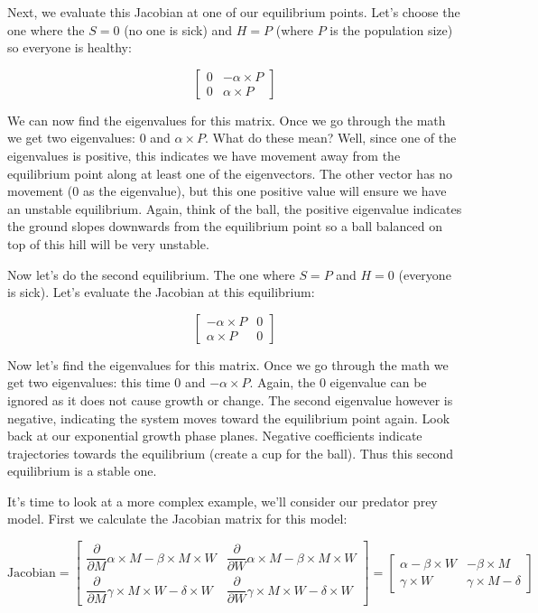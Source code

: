 \documentclass[]{memoir}
\begin{document}
Next, we evaluate this Jacobian at one of our equilibrium points. Let's
choose the one where the $S=0$ (no one is sick) and $H=P$ (where $P$ is
the population size) so everyone is healthy:

\[
\begin{bmatrix}
0 & -\alpha \times P \\
0 & \alpha \times P
\end{bmatrix}
\]

We can now find the eigenvalues for this matrix. Once we go through the
math we get two eigenvalues: 0 and $\alpha \times P$. What do these
mean? Well, since one of the eigenvalues is positive, this indicates we
have movement away from the equilibrium point along at least one of the
eigenvectors. The other vector has no movement (0 as the eigenvalue),
but this one positive value will ensure we have an unstable equilibrium.
Again, think of the ball, the positive eigenvalue indicates the ground
slopes downwards from the equilibrium point so a ball balanced on top of
this hill will be very unstable.

Now let's do the second equilibrium. The one where $S=P$ and $H=0$
(everyone is sick). Let's evaluate the Jacobian at this equilibrium:

\[
\begin{bmatrix}
-\alpha \times P & 0 \\
\alpha \times P & 0
\end{bmatrix}
\]

Now let's find the eigenvalues for this matrix. Once we go through the
math we get two eigenvalues: this time 0 and $-\alpha \times P$. Again,
the 0 eigenvalue can be ignored as it does not cause growth or change.
The second eigenvalue however is negative, indicating the system moves
toward the equilibrium point again. Look back at our exponential growth
phase planes. Negative coefficients indicate trajectories towards the
equilibrium (create a cup for the ball). Thus this second equilibrium is
a stable one.

It's time to look at a more complex example, we'll consider our predator
prey model. First we calculate the Jacobian matrix for this model:

\[
\text{Jacobian} = \begin{bmatrix} \dfrac{\partial}{\partial M }  \alpha \times M - \beta \times M \times W & \dfrac{\partial}{\partial W }  \alpha \times M - \beta \times M \times W  \\  \dfrac{\partial}{\partial M } \gamma \times M \times W - \delta \times W & \dfrac{\partial}{\partial W } \gamma \times M \times W - \delta \times W \end{bmatrix} = \begin{bmatrix}
\alpha - \beta \times W & -\beta \times M \\
\gamma \times W & \gamma \times M - \delta
\end{bmatrix}
\]
\end{document}
